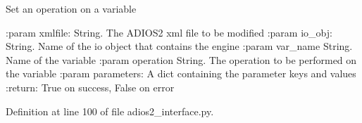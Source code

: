 \begin{DoxyVerb}Set an operation on a variable

:param xmlfile: String. The ADIOS2 xml file to be modified
:param io_obj: String. Name of the io object that contains the engine
:param var_name String. Name of the variable
:param operation String. The operation to be performed on the variable
:param parameters: A dict containing the parameter keys and values
:return: True on success, False on error
\end{DoxyVerb}
 

Definition at line 100 of file adios2\+\_\+interface.\+py.

